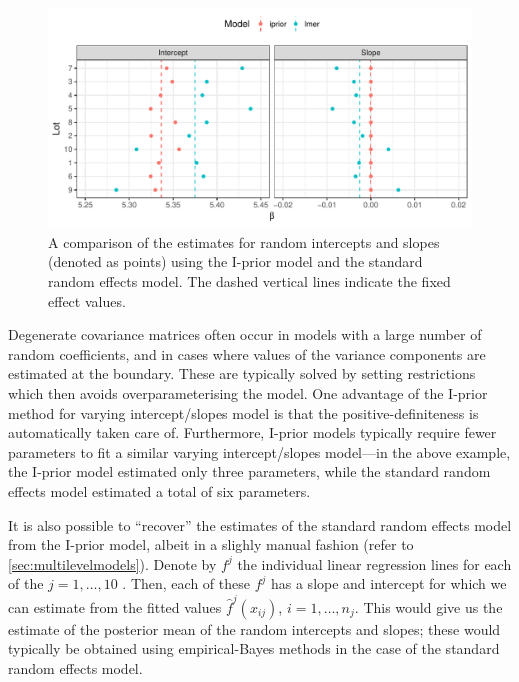 \documentclass[showframe,11pt]{report}\usepackage[]{graphicx}\usepackage[]{color}
\makeatletter
\def\maxwidth{ %
  \ifdim\Gin@nat@width>\linewidth
    \linewidth
  \else
    \Gin@nat@width
  \fi
}
\newenvironment{knitrout}{}{} %
\makeatother
\begin{document}
\begin{knitrout}
\color{fgcolor}\begin{figure}[htbp]

{\centering \includegraphics[width=\maxwidth]{figure/04-IGF_plot_beta-1} 

}

\caption[A comparison of the estimates for random intercepts and slopes (denoted as points) using the I-prior model and the standard random effects model]{A comparison of the estimates for random intercepts and slopes (denoted as points) using the I-prior model and the standard random effects model. The dashed vertical lines indicate the fixed effect values.}\label{fig:IGF.plot.beta}
\end{figure}


\end{knitrout}

\pagebreak
Degenerate covariance matrices often occur in models with a large number of random coefficients, and in cases where values of the variance components are estimated at the boundary.
These are typically solved by setting restrictions which then avoids overparameterising the model.
One advantage of the I-prior method for varying intercept/slopes model is that the positive-definiteness is automatically taken care of.
Furthermore, I-prior models typically require fewer parameters to fit a similar varying intercept/slopes model---in the above example, the I-prior model estimated only three parameters, while the standard random effects model estimated a total of six parameters.

It is also possible to ``recover'' the estimates of the standard random effects model from the I-prior model, albeit in a slighly manual fashion (refer to \cref{sec:multilevelmodels}).
Denote by $f^j$ the individual linear regression lines for each of the $j=1,\dots,10$ .
Then, each of these $f^j$ has a slope and intercept for which we can estimate from the fitted values $\hat f^j(x_{ij})$, $i=1,\dots,n_j$.
This would give us the estimate of the posterior mean of the random intercepts and slopes; these would typically be obtained using empirical-Bayes methods in the case of the standard random effects model.
\end{document}
